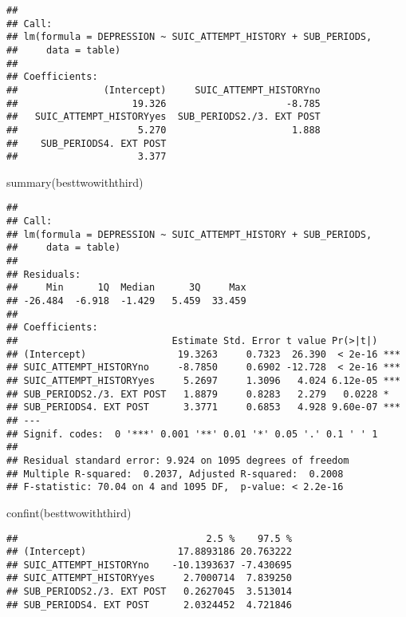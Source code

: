 \documentclass[
]{book}
\newenvironment{Shaded}{\begin{snugshade}}{\end{snugshade}}
\newcommand{\FunctionTok}[1]{\textcolor[rgb]{0.00,0.00,0.00}{#1}}
\newcommand{\NormalTok}[1]{#1}
\begin{document}
\begin{verbatim}
## 
## Call:
## lm(formula = DEPRESSION ~ SUIC_ATTEMPT_HISTORY + SUB_PERIODS, 
##     data = table)
## 
## Coefficients:
##               (Intercept)     SUIC_ATTEMPT_HISTORYno  
##                    19.326                     -8.785  
##   SUIC_ATTEMPT_HISTORYyes  SUB_PERIODS2./3. EXT POST  
##                     5.270                      1.888  
##    SUB_PERIODS4. EXT POST  
##                     3.377
\end{verbatim}

\begin{Shaded}
\begin{Highlighting}[]
\FunctionTok{summary}\NormalTok{(besttwowiththird)}
\end{Highlighting}
\end{Shaded}

\begin{verbatim}
## 
## Call:
## lm(formula = DEPRESSION ~ SUIC_ATTEMPT_HISTORY + SUB_PERIODS, 
##     data = table)
## 
## Residuals:
##     Min      1Q  Median      3Q     Max 
## -26.484  -6.918  -1.429   5.459  33.459 
## 
## Coefficients:
##                           Estimate Std. Error t value Pr(>|t|)    
## (Intercept)                19.3263     0.7323  26.390  < 2e-16 ***
## SUIC_ATTEMPT_HISTORYno     -8.7850     0.6902 -12.728  < 2e-16 ***
## SUIC_ATTEMPT_HISTORYyes     5.2697     1.3096   4.024 6.12e-05 ***
## SUB_PERIODS2./3. EXT POST   1.8879     0.8283   2.279   0.0228 *  
## SUB_PERIODS4. EXT POST      3.3771     0.6853   4.928 9.60e-07 ***
## ---
## Signif. codes:  0 '***' 0.001 '**' 0.01 '*' 0.05 '.' 0.1 ' ' 1
## 
## Residual standard error: 9.924 on 1095 degrees of freedom
## Multiple R-squared:  0.2037, Adjusted R-squared:  0.2008 
## F-statistic: 70.04 on 4 and 1095 DF,  p-value: < 2.2e-16
\end{verbatim}

\begin{Shaded}
\begin{Highlighting}[]
\FunctionTok{confint}\NormalTok{(besttwowiththird)}
\end{Highlighting}
\end{Shaded}

\begin{verbatim}
##                                 2.5 %    97.5 %
## (Intercept)                17.8893186 20.763222
## SUIC_ATTEMPT_HISTORYno    -10.1393637 -7.430695
## SUIC_ATTEMPT_HISTORYyes     2.7000714  7.839250
## SUB_PERIODS2./3. EXT POST   0.2627045  3.513014
## SUB_PERIODS4. EXT POST      2.0324452  4.721846
\end{verbatim}
\end{document}
